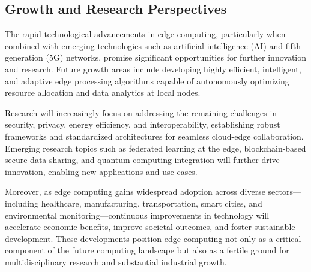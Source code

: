 \documentclass[runningheads]{llncs}
\begin{document}
\subsection{Growth and Research Perspectives}

The rapid technological advancements in edge computing, particularly when combined with emerging technologies such as artificial intelligence (AI) and fifth-generation (5G) networks, promise significant opportunities for further innovation and research. Future growth areas include developing highly efficient, intelligent, and adaptive edge processing algorithms capable of autonomously optimizing resource allocation and data analytics at local nodes.

Research will increasingly focus on addressing the remaining challenges in security, privacy, energy efficiency, and interoperability, establishing robust frameworks and standardized architectures for seamless cloud-edge collaboration. Emerging research topics such as federated learning at the edge, blockchain-based secure data sharing, and quantum computing integration will further drive innovation, enabling new applications and use cases.

Moreover, as edge computing gains widespread adoption across diverse sectors—including healthcare, manufacturing, transportation, smart cities, and environmental monitoring—continuous improvements in technology will accelerate economic benefits, improve societal outcomes, and foster sustainable development. These developments position edge computing not only as a critical component of the future computing landscape but also as a fertile ground for multidisciplinary research and substantial industrial growth.
\end{document}
